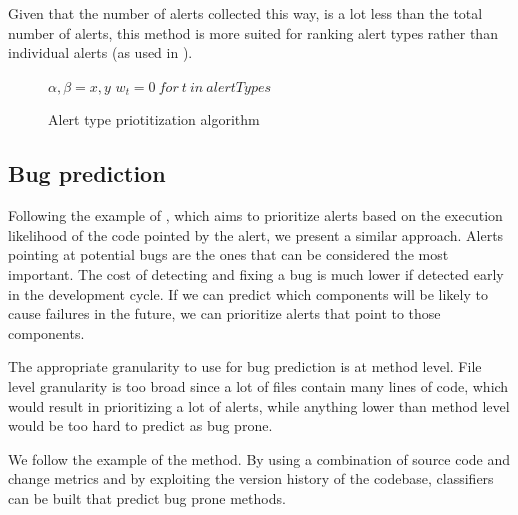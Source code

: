 Given that the number of alerts collected this way, is a lot less than the total number of alerts, this method is more suited for ranking alert types rather than individual alerts (as used in \cite{which_warnings}).

\begin{figure}[ht]
	\centering
	\begin{minipage}{.5\linewidth}
		\begin{algorithm}[H]
			\SetAlgoLined
			$\alpha, \beta = x, y$\;
			$w_t = 0 \ for \ t \ in \ alertTypes$\;
			\caption{Alert type priotitization algorithm}
		\end{algorithm}
	\end{minipage}
\end{figure}

\subsection{Bug prediction}

Following the example of \cite{static_profiling}, which aims to prioritize alerts based on the execution likelihood of the code pointed by the alert, we present a similar approach. Alerts pointing at potential bugs are the ones that can be considered the most important. The cost of detecting and fixing a bug is much lower if detected early in the development cycle. If we can predict which components will be likely to cause failures in the future, we can prioritize alerts that point to those components. 

The appropriate granularity to use for bug prediction is at method level. File level granularity is too broad since a lot of files contain many lines of code, which would result in prioritizing a lot of alerts, while anything lower than method level would be too hard to predict as bug prone.

We follow the example of the \cite{prediction_method} method. By using a combination of source code and change metrics and by exploiting the version history of the codebase, classifiers can be built that predict bug prone methods.

